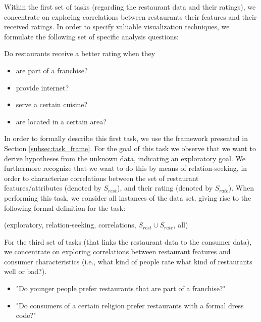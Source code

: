 Within the first set of tasks (regarding the restaurant data and their ratings), we concentrate on exploring correlations between restaurants their features and their received ratings. In order to specify valuable visualization techniques, we formulate the following set of specific analysis questions:

Do restaurants receive a better rating when they
\begin{itemize}
\setlength{\itemsep}{0cm}%
\setlength{\parskip}{0cm}%
\item are part of a franchise?
\item provide internet?
\item serve a certain cuisine?
\item are located in a certain area?
\end{itemize}

In order to formally describe this first task, we use the framework presented in Section \ref{subsec:task_frame}. For the goal of this task we observe that we want to derive hypotheses from the unknown data, indicating an exploratory goal. We furthermore recognize that we want to do this by means of relation-seeking, in order to characterize correlations between the set of restaurant features/attributes (denoted by $S_{rest}$), and their rating (denoted by $S_{rate}$). When performing this task, we consider all instances of the data set, giving rise to the following formal definition for the task:

(exploratory, relation-seeking, correlations, $S_{rest} \cup S_{rate}$, all)

For the third set of tasks (that links the restaurant data to the consumer data), we concentrate on exploring correlations between restaurant features and consumer characteristics (i.e., what kind of people rate what kind of restaurants well or bad?).

\begin{itemize}
\setlength{\itemsep}{0cm}%
\setlength{\parskip}{0cm}%
\item "Do younger people prefer restaurants that are part of a franchise?"
\item "Do consumers of a certain religion prefer restaurants with a formal dress code?"
\end{itemize}


